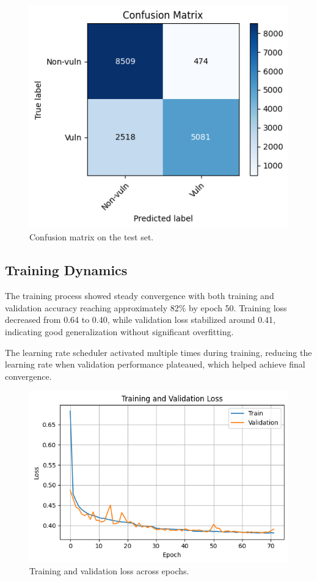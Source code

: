 \begin{figure}[t]
	\centering
	\includegraphics[width=\linewidth]{../model/logs/confusion_matrix.png}
	\caption{Confusion matrix on the test set.}
	\label{fig:confusion-matrix}
\end{figure}

\subsection{Training Dynamics}

The training process showed steady convergence with both training and validation accuracy reaching approximately 82\% by epoch 50. Training loss decreased from 0.64 to 0.40, while validation loss stabilized around 0.41, indicating good generalization without significant overfitting.

The learning rate scheduler activated multiple times during training, reducing the learning rate when validation performance plateaued, which helped achieve final convergence.

\begin{figure}[t]
	\centering
	\includegraphics[width=\linewidth]{../model/logs/training_loss.png}
	\caption{Training and validation loss across epochs.}
	\label{fig:training-loss}
\end{figure}

